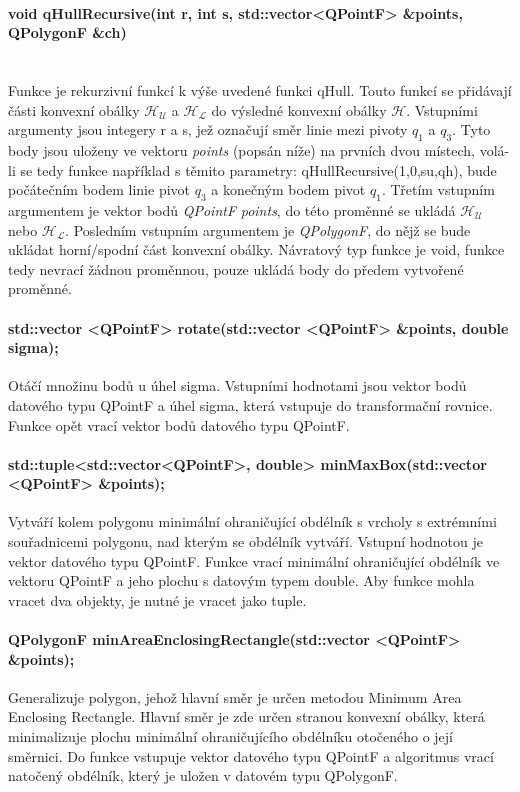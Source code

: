 \documentclass[11pt]{article}
\begin{document}
	\paragraph{void qHullRecursive(int r, int s, std::vector<QPointF> \&points, QPolygonF \&ch)}\mbox{}\\
	Funkce je rekurzivní funkcí k výše uvedené funkci qHull. Touto funkcí se přidávají části konvexní obálky $\mathcal{H_U}$ a $\mathcal{H_L}$ do výsledné konvexní obálky $\mathcal{H}$.
 	Vstupními argumenty jsou integery r a s, jež označují směr linie mezi pivoty \textit{$ q_1 $} a \textit{$ q_3 $}. Tyto body jsou uloženy ve vektoru \textit{points} (popsán níže) na prvních dvou místech, volá-li se tedy funkce například s těmito parametry: qHullRecursive(1,0,su,qh), bude počátečním bodem linie pivot \textit{$ q_3 $} a konečným bodem pivot \textit{$ q_1 $}. Třetím vstupním argumentem je vektor bodů \textit{QPointF} \textit{points}, do této proměnné se ukládá  $\mathcal{H_U}$ nebo $\mathcal{H_L}$. Posledním vstupním argumentem je \textit{QPolygonF}, do nějž se bude ukládat horní/spodní část konvexní obálky. Návratový typ funkce je void, funkce tedy nevrací žádnou proměnnou, pouze ukládá body do předem vytvořené proměnné.
 	
 	\paragraph{std::vector <QPointF> rotate(std::vector <QPointF> \&points, double sigma);}
 	Otáčí množinu bodů u úhel sigma. Vstupními hodnotami jsou vektor bodů datového typu QPointF a úhel sigma, která vstupuje do transformační rovnice. Funkce opět vrací vektor bodů datového typu QPointF.
 	
 	\paragraph{std::tuple<std::vector<QPointF>, double> minMaxBox(std::vector <QPointF> \&points);}
 	Vytváří kolem polygonu minimální ohraničující obdélník s vrcholy s extrémními souřadnicemi polygonu, nad kterým se obdélník vytváří. Vstupní hodnotou je vektor datového typu QPointF. Funkce vrací minimální ohraničující obdélník ve vektoru QPointF a jeho plochu s datovým typem double. Aby funkce mohla vracet dva objekty, je nutné je vracet jako tuple.
 	
 	\paragraph{QPolygonF minAreaEnclosingRectangle(std::vector <QPointF> \&points);}
 	Generalizuje polygon, jehož hlavní směr je určen metodou Minimum Area Enclosing Rectangle. Hlavní směr je zde určen stranou konvexní obálky, která minimalizuje plochu minimální  ohraničujícího obdélníku otočeného o její směrnici. Do funkce vstupuje vektor datového typu QPointF a algoritmus vrací natočený obdélník, který je uložen v datovém typu QPolygonF.
 	
\end{document}
